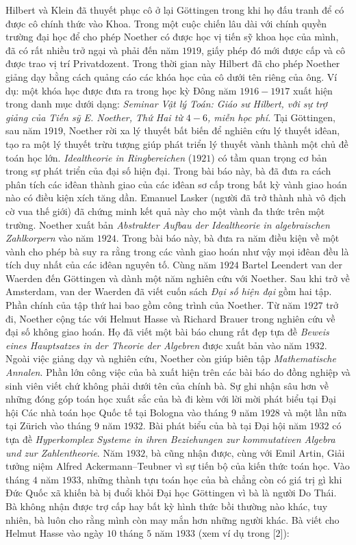 \begin{multicols}{2}
	\vskip 0.05cm
	Hilbert và Klein đã thuyết phục cô ở lại Göttingen trong khi họ đấu tranh để có được cô chính thức vào Khoa. Trong một cuộc chiến lâu dài với chính quyền trường đại học để cho phép Noether có được học vị tiến sỹ khoa học của mình, đã có rất nhiều trở ngại và phải đến năm $1919$, giấy phép đó mới được cấp và cô được trao vị trí Privatdozent. Trong thời gian này Hilbert đã cho phép Noether giảng dạy bằng cách quảng cáo các khóa học của cô dưới tên riêng của ông. Ví dụ: một khóa học được đưa ra trong học kỳ Đông năm $1916-1917$ xuất hiện trong danh mục dưới dạng:
	\vskip 0.05cm
	\textit{Seminar Vật lý Toán: Giáo sư Hilbert, với sự trợ giảng của Tiến sỹ E. Noether, Thứ Hai từ $4-6$, miễn học phí.}
	\vskip 0.05cm
	Tại Göttingen, sau năm $1919$, Noether rời xa lý thuyết bất biến để nghiên cứu lý thuyết iđêan, tạo ra một lý thuyết trừu tượng giúp phát triển lý thuyết vành thành một chủ đề toán học lớn. \textit{Idealtheorie in Ringbereichen} ($1921$) có tầm quan trọng cơ bản trong sự phát triển của đại số hiện đại. Trong bài báo này, bà đã đưa ra cách phân tích các iđêan thành giao của các iđêan sơ cấp trong bất kỳ vành giao hoán nào có điều kiện xích tăng dần. Emanuel Lasker (người đã trở thành nhà vô địch cờ vua thế giới) đã chứng minh kết quả này cho một vành đa thức trên một trường. Noether xuất bản \textit{Abstrakter Aufbau der Idealtheorie in algebraischen Zahlkorpern} vào năm $1924$. Trong bài báo này, bà đưa ra năm điều kiện về một vành cho phép bà suy ra rằng trong các vành giao hoán như vậy mọi iđêan đều là tích duy nhất của các iđêan nguyên tố.
	\vskip 0.05cm
	Cùng năm $1924$ Bartel Leendert  van der Waerden đến Göttingen và dành một năm nghiên cứu với Noether. Sau khi trở về Amsterdam, van der Waerden đã viết cuốn sách \textit{Đại số hiện đại} gồm hai tập. Phần chính của tập thứ hai bao gồm công trình của Noether. Từ năm $1927$ trở đi, Noether cộng tác với Helmut Hasse và Richard Brauer trong nghiên cứu về đại số không giao hoán. Họ đã viết một bài báo chung rất đẹp tựa đề \textit{Beweis eines Hauptsatzes in der Theorie der Algebren} được xuất bản vào năm $1932$. Ngoài việc giảng dạy và nghiên cứu, Noether còn giúp biên tập \textit{Mathematische Annalen}. Phần lớn công việc của bà xuất hiện trên các bài báo do đồng nghiệp và sinh viên viết chứ không phải dưới tên của chính bà.
	\vskip 0.05cm
	Sự ghi nhận sâu hơn về những đóng góp toán học xuất sắc của bà đi kèm với lời mời phát biểu tại Đại hội Các nhà toán học Quốc tế  tại Bologna vào tháng $9$ năm $1928$ và một lần nữa tại Zürich vào tháng $9$ năm $1932$. Bài phát biểu của bà tại Đại hội năm $1932$ có tựa đề \textit{Hyperkomplex Systeme in ihren Beziehungen zur kommutativen Algebra und zur Zahlentheorie}. Năm $1932$, bà cũng nhận được, cùng với Emil Artin, Giải tưởng niệm Alfred Ackermann--Teubner vì sự tiến bộ của kiến thức toán học. Vào tháng $4$ năm $1933$, những thành tựu toán học của bà chẳng còn có giá trị gì khi Đức Quốc xã khiến bà bị đuổi khỏi Đại học Göttingen vì bà là người Do Thái. Bà không nhận được trợ cấp hay bất kỳ hình thức bồi thường nào khác, tuy nhiên, bà luôn cho rằng mình còn may mắn hơn những người khác. Bà viết cho Helmut Hasse vào ngày $10$ tháng $5$ năm $1933$ (xem ví dụ trong [$2$]):

\end{multicols}
